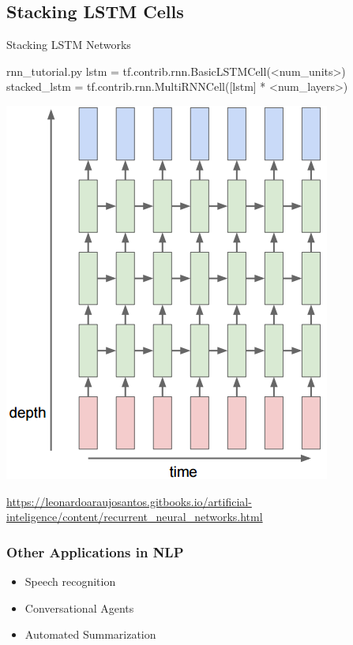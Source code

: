 \documentclass[pdf]{beamer}
\newenvironment{code}{\ttfamily\scriptsize\begin{block}}{\end{block}}
\begin{document}
\subsection{Stacking LSTM Cells}
\begin{frame}{Stacking LSTM Networks}
  \begin{code}{rnn\_tutorial.py}
    lstm = tf.contrib.rnn.BasicLSTMCell(<num\_units>)\\
    stacked\_lstm = tf.contrib.rnn.MultiRNNCell([lstm] * <num\_layers>)
  \end{code}
  \begin{center}
    \includegraphics[scale=0.2]{RNN_Stacking.png}\\
  \end{center}
  \footnotesize \url{https://leonardoaraujosantos.gitbooks.io/artificial-inteligence/content/recurrent_neural_networks.html}
\end{frame}

\begin{frame}
  \frametitle{Other Applications in NLP}
  \begin{itemize}
  \item Speech recognition
  \item Conversational Agents
  \item Automated Summarization
  \end{itemize}
\end{frame}
\end{document}
